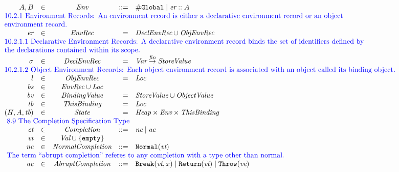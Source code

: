 \documentclass[a4paper, leqno]{amsart}
\newcommand{\mkst}[2]{#1::#2}
\def\inblue{\color{blue}}
\newcommand{\er}{\ensuremath{\sigma}}
\newcommand{\sv}{\emph{StoreValue}}
\newcommand{\tb}{\emph{tb}}
\newcommand{\Val}{\emph{Val}}
\newcommand{\Loc}{\emph{Loc}}
\newcommand{\Heap}{\emph{Heap}}
\newcommand{\State}{\emph{State}}
\newcommand{\Var}{\emph{Var}}
\newcommand{\Env}{\emph{Env}}
\renewcommand{\lg}{{\tt \#Global}}
\newcommand{\finto}{\stackrel{\tiny \emph{fin}}{\rightarrow}}
\newcommand{\vorempty}{\emph{vt}}
\newcommand{\state}{\ensuremath{(H,A,\tb)}}
\def\inblue{\color{blue}}
\begin{document}
\[\begin{array}{rlcrll}
A, B & \in & \Env & ::= & \lg \mid \mkst{\emph{er}}A\\

\multicolumn{6}{l}{\inblue
\mbox{10.2.1 Environment Records:
An environment record is either a declarative environment record or an object}}\\
\multicolumn{6}{l}{\inblue
\mbox{environment record.}}\\

\emph{er} & \in & \emph{EnvRec} & = & \emph{DeclEnvRec} \cup \emph{ObjEnvRec}\\

\multicolumn{6}{l}{\inblue
\mbox{10.2.1.1 Declarative Environment Records:
A declarative environment record binds the set of identifiers defined by}}\\
\multicolumn{6}{l}{\inblue
\mbox{the declarations contained within its scope.}}\\
\er & \in & \emph{DeclEnvRec} & = & \Var \finto \sv&\\

\multicolumn{6}{l}{\inblue
\mbox{10.2.1.2 Object Environment Records:
Each object environment record is associated with an object called its binding object.}}\\
l & \in & \emph{ObjEnvRec} & = & \Loc\\

\emph{bs} & \in & \emph{EnvRec} \cup \Loc\\

\emph{bv} & \in & \emph{BindingValue} & = & \emph{StoreValue} \cup \emph{ObjectValue}\\


\tb &\in&\emph{ThisBinding} & = & \Loc\\
\state &\in&\State & = & \Heap \times \Env \times \emph{ThisBinding}\\

\multicolumn{6}{l}{\inblue\mbox{
8.9 The Completion Specification Type}}\\
\emph{ct}&\in&\emph{Completion} &::=& \emph{nc} \mid \emph{ac}\\
\vorempty&\in&\Val \cup \{{\tt empty}\}\\
\emph{nc}&\in&\emph{NormalCompletion} &::=& {\tt Normal}(\vorempty)\\

\multicolumn{6}{l}{\inblue\mbox{
The term ``abrupt completion'' referes to any completion with a type other than normal.}}\\
\emph{ac}&\in&\emph{AbruptCompletion} &::=&
{\tt Break}(\vorempty, x) \mid
{\tt Return}(\vorempty) \mid
{\tt Throw}(\emph{ve})\\
\end{array}
\]
\end{document}
